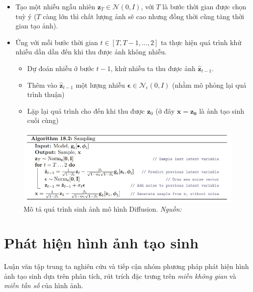 %
\begin{itemize}
	\item Tạo một nhiễu ngẫu nhiên $\mathbf{z}_T \in \mathcal{N}(0,I)$, với $\mathit{T}$ là bước thời gian được chọn tuỳ ý ($\mathit{T}$ càng lớn thì chất lượng ảnh sẽ cao nhưng đồng thời cũng tăng thời gian tạo ảnh).
	\item Ứng với mỗi bước thời gian $\mathit{t} \in [T,T-1,...,2]$ ta thực hiện quá trình khử nhiễu dần dần đến khi thu được ảnh không nhiễu.
		\begin{itemize}
			\item Dự đoán nhiễu ở bước $\mathit{t-1}$, khử nhiễu ta thu được ảnh $\mathbf{\hat{z}}_{t-1}$.
			\item Thêm vào $\mathbf{\hat{z}}_{t-1}$ một lượng nhiễu $\mathbf{\epsilon} \in \mathcal{N}_\epsilon(0,I)$ (nhằm mô phỏng lại quá trình thuận)
			\item Lặp lại quá trình cho đến khi thu được $\mathbf{z}_0$ (ở đây $\mathbf{x=z_0}$ là ảnh tạo sinh cuối cùng)
		\end{itemize}

\end{itemize}
%
\begin{figure}[h]
	\centering
	\includegraphics[width=0.9\linewidth]{Images/model-diffusion-sampling-1.png}
	\caption{
		Mô tả quá trình sinh ảnh mô hình Diffusion.
		\textit{Nguồn: \cite{prince2023understanding}}
	}
	\label{fig:model-diffusion-sampling-1}
\end{figure}
%
\section{Phát hiện hình ảnh tạo sinh}
%
Luận văn tập trung ta nghiên cứu và tiếp cận nhóm phương pháp phát hiện hình ảnh tạo sinh dựa trên phân tích, rút trích đặc trưng trên \textit{miền không gian} và \textit{miền tần số} của hình ảnh.
%
%
